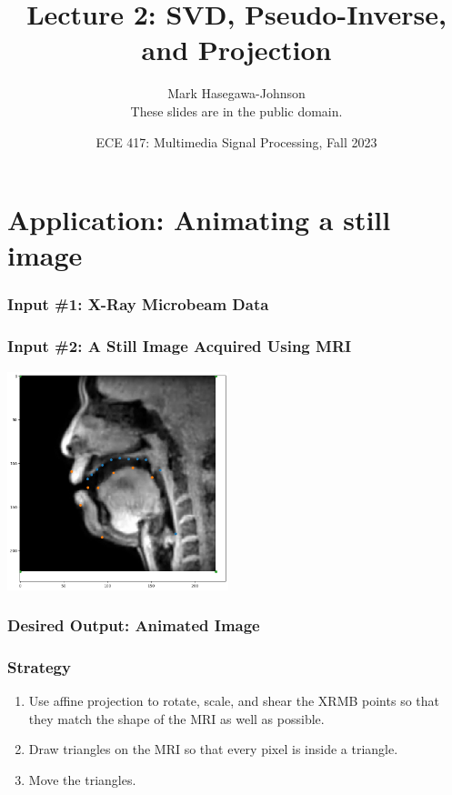 \documentclass{beamer}
\title{Lecture 2: SVD, Pseudo-Inverse, and Projection}
\author{Mark Hasegawa-Johnson\\These slides are in the public domain.}
\date{ECE 417: Multimedia Signal Processing, Fall 2023}
\institute{University of Illinois}
\begin{document}
\begin{frame}
  \maketitle
\end{frame}

\begin{frame}
  \tableofcontents
\end{frame}

\section{Application: Animating a still image}
\setcounter{subsection}{1}

\begin{frame}
  \frametitle{Input \#1: X-Ray Microbeam Data}
  \centerline{}
\end{frame}

\begin{frame}
  \frametitle{Input \#2: A Still Image Acquired Using MRI}
  \centerline{\includegraphics[height=2.5in]{mp1_mri_points.png}}
\end{frame}

\begin{frame}
  \frametitle{Desired Output: Animated Image}
  \centerline{}
\end{frame}

\begin{frame}
  \frametitle{Strategy}
  \begin{enumerate}
  \item Use affine projection to rotate, scale, and shear the XRMB
    points so that they match the shape of the MRI as well as possible.
  \item Draw triangles on the MRI so that every pixel is inside a triangle.
  \item Move the triangles.
  \end{enumerate}
\end{frame}
\end{document}
